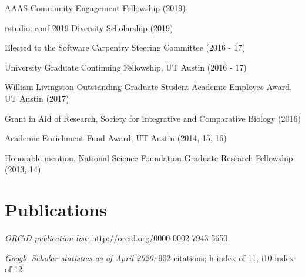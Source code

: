 \documentclass[margin,line]{CV}
\begin{document}
\begin{resume}
\begin{description}[leftmargin=0pt]  
\setlength{\itemsep}{1pt} 
\item[] AAAS Community Engagement Fellowship (2019)
\item[] rstudio::conf 2019 Diversity Scholarship (2019)
\item[] Elected to the Software Carpentry Steering Committee (2016 - 17)
\item[] University Graduate Continuing Fellowship, UT Austin (2016 - 17)
\item[] William Livingston Outstanding Graduate Student Academic Employee Award, UT Austin (2017)
\item[] Grant in Aid of Research,  Society for Integrative and Comparative Biology (2016)
\item[] Academic Enrichment Fund Award, UT Austin (2014, 15, 16)
\item[] Honorable mention, National Science Foundation Graduate Research Fellowship (2013, 14)
\end{description}




\section{\mysidestyle Publications}
    
\begin{description}[leftmargin=0pt]  
\setlength{\itemsep}{2pt} 
\item[] {\em ORCiD publication list:} \url{http://orcid.org/0000-0002-7943-5650}
\item[] {\em Google Scholar statistics as of April 2020:} 902 citations; h-index of 11, i10-index of 12
\end{description}


\end{resume}
\end{document}
